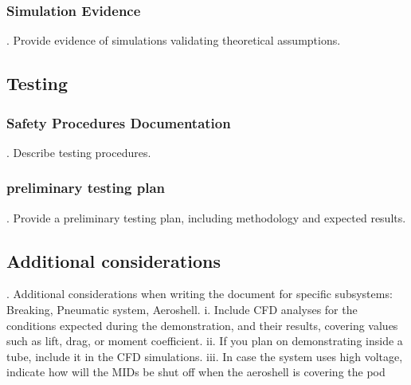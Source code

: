 \subsubsection{Simulation Evidence}
.  Provide evidence of simulations validating theoretical assumptions.


\subsection{Testing}
\subsubsection{Safety Procedures Documentation}
.  Describe testing procedures.
\subsubsection{preliminary testing plan}
.  Provide a preliminary testing plan, including methodology and expected results.


\subsection{Additional considerations}
.  Additional considerations when writing the document for specific subsystems: Breaking, Pneumatic system, Aeroshell.
i. 		Include CFD analyses for the conditions expected during the demonstration, and their
		results, covering values such as lift, drag, or moment coefficient.
ii. 		If you plan on demonstrating inside a tube, include it in the CFD simulations.
iii. 	In case the system uses high voltage, indicate how will the MIDs be shut off when the
		aeroshell is covering the pod
